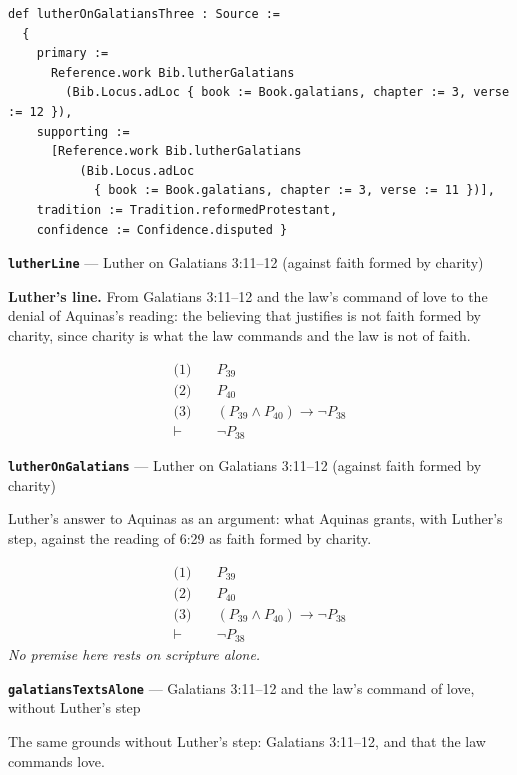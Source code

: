 \documentclass[11pt]{article}
\begin{document}
{\small\begin{verbatim}
def lutherOnGalatiansThree : Source :=
  {
    primary :=
      Reference.work Bib.lutherGalatians
        (Bib.Locus.adLoc { book := Book.galatians, chapter := 3, verse := 12 }),
    supporting :=
      [Reference.work Bib.lutherGalatians
          (Bib.Locus.adLoc
            { book := Book.galatians, chapter := 3, verse := 11 })],
    tradition := Tradition.reformedProtestant,
    confidence := Confidence.disputed }
\end{verbatim}}
\par\medskip\noindent\textbf{\texttt{luther\allowbreak{}Line}} --- Luther on Galatians 3:11–12 (against faith formed by charity)\par\nobreak\noindent
\textbf{Luther's line.} From Galatians 3:11–12 and the law's command of love to the denial of Aquinas's reading: the believing that justifies is not faith formed by charity, since charity is what the law commands and the law is not of faith.

\begin{align*}
  \text{(1)} \quad & P_{39} \\
  \text{(2)} \quad & P_{40} \\
  \text{(3)} \quad & (P_{39} \land P_{40}) \rightarrow \lnot P_{38} \\
  \vdash \quad & \lnot P_{38}
\end{align*}
\par\medskip\noindent\textbf{\texttt{luther\allowbreak{}On\allowbreak{}Galatians}} --- Luther on Galatians 3:11–12 (against faith formed by charity)\par\nobreak\noindent
Luther's answer to Aquinas as an argument: what Aquinas grants, with Luther's step, against the reading of 6:29 as faith formed by charity.

\begin{align*}
  \text{(1)} \quad & P_{39} \\
  \text{(2)} \quad & P_{40} \\
  \text{(3)} \quad & (P_{39} \land P_{40}) \rightarrow \lnot P_{38} \\
  \vdash \quad & \lnot P_{38}
\end{align*}
\emph{No premise here rests on scripture alone.}
\par\medskip\noindent\textbf{\texttt{galatians\allowbreak{}Texts\allowbreak{}Alone}} --- Galatians 3:11–12 and the law's command of love, without Luther's step\par\nobreak\noindent
The same grounds without Luther's step: Galatians 3:11–12, and that the law commands love.
\end{document}
